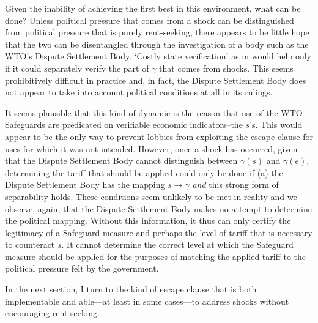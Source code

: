 \documentclass[12pt]{article}
\newcommand{\ga}{\gamma}
\begin{document}
Given the inability of achieving the first best in this environment, what can be done? Unless political pressure that comes from a shock can be distinguished from political pressure that is purely rent-seeking, there appears to be little hope that the two can be disentangled through the investigation of a body such as the WTO's Dispute Settlement Body. `Costly state verification' as in \Textcite{bb} would help only if it could separately verify the part of $\ga$ that comes from shocks. This seems prohibitively difficult in practice and, in fact, the Dispute Settlement Body does not appear to take into account political conditions at all in its rulings.

It seems plausible that this kind of dynamic is the reason that use of the WTO Safeguards are predicated on verifiable economic indicators--the $s$'s. This would appear to be the only way to prevent lobbies from exploiting the escape clause for uses for which it was not intended. However, once a shock has occurred, given that the Dispute Settlement Body cannot distinguish between $\ga(s)$ and $\ga(e)$, determining the tariff that should be applied could only be done if (a) the Dispute Settlement Body has the mapping $s \rightarrow \ga$ \textit{and} this strong form of separability holds. These conditions seem unlikely to be met in reality and we observe, again, that the Dispute Settlement Body makes no attempt to determine the political mapping. Without this information, it thus can only certify the legitimacy of a Safeguard measure and perhaps the level of tariff that is necessary to counteract $s$. It cannot determine the correct level at which the Safeguard measure should be applied for the purposes of matching the applied tariff to the political pressure felt by the government.

In the next section, I turn to the kind of escape clause that is both implementable and able---at least in some cases---to address shocks without encouraging rent-seeking.
\end{document}
